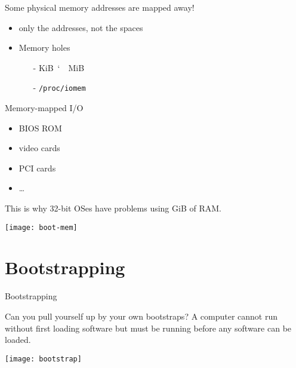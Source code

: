 \begin{frame}[plain]
  \begin{minipage}{.55\linewidth}
    \begin{block}{Some physical memory addresses are mapped away!}
      \begin{itemize}
      \item only the addresses, not the spaces
      \item Memory holes
        \begin{itemize}
        \item[-] \unit[640]{KiB}~\char`~~\unit[1]{MiB}
        \item[-] \texttt{/proc/iomem}
        \end{itemize}
      \end{itemize}
    \end{block}
    \begin{block}{Memory-mapped I/O}
      \begin{itemize}
      \item BIOS ROM
      \item video cards
      \item PCI cards
      \item \ldots
      \end{itemize}
      This is why 32-bit OSes have problems using \unit[4]{GiB} of RAM.
    \end{block}
  \end{minipage}\quad
  \begin{minipage}{.35\linewidth}
    \texttt{[image: boot-mem]}
  \end{minipage}
\end{frame}

\section{Bootstrapping}
\label{sec:bootstrapping}

\begin{frame}{Bootstrapping}
  \begin{minipage}{.85\linewidth}
    \begin{block}{Can you pull yourself up by your own bootstraps?}
      A computer cannot run without first loading software but must be
      running before any software can be loaded.
    \end{block}
  \end{minipage}\hfill
  \begin{minipage}{.1\linewidth}
    \texttt{[image: bootstrap]}
  \end{minipage}
    \begin{center}
  \end{center}
\end{frame}

